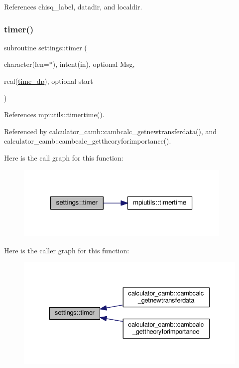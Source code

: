 References chisq\+\_\+label, datadir, and localdir.

\mbox{\label{namespacesettings_aae1de2bfeb89f23588e7f18024be2a44}} 
\subsubsection{\texorpdfstring{timer()}{timer()}}
{\footnotesize\ttfamily subroutine settings\+::timer (\begin{DoxyParamCaption}\item[{character(len=$\ast$), intent(in), optional}]{Msg,  }\item[{real(\mbox{\hyperlink{namespacesettings_a3d81f31b9e0eef8de19fb9b016043af7}{time\+\_\+dp}}), optional}]{start }\end{DoxyParamCaption})}



References mpiutils\+::timertime().



Referenced by calculator\+\_\+camb\+::cambcalc\+\_\+getnewtransferdata(), and calculator\+\_\+camb\+::cambcalc\+\_\+gettheoryforimportance().

Here is the call graph for this function\+:
\nopagebreak
\begin{figure}[H]
\begin{center}
\leavevmode
\includegraphics[width=294pt]{namespacesettings_aae1de2bfeb89f23588e7f18024be2a44_cgraph}
\end{center}
\end{figure}
Here is the caller graph for this function\+:
\nopagebreak
\begin{figure}[H]
\begin{center}
\leavevmode
\includegraphics[width=332pt]{namespacesettings_aae1de2bfeb89f23588e7f18024be2a44_icgraph}
\end{center}
\end{figure}
\mbox{\label{namespacesettings_a5cc488a2d56e898983e233e99a14cee0}} 
